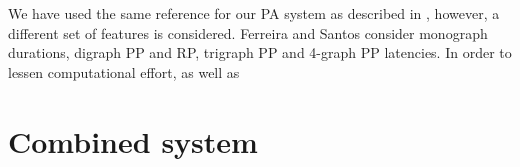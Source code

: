 We have used the same reference for our PA system as described in , however, a different set of features is considered.
Ferreira and Santos \cite{superResults} consider monograph durations, digraph PP and RP, trigraph PP and 4-graph PP latencies.
In order to lessen computational effort, as well as 

\section{Combined system}


%




%
%
%
